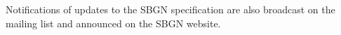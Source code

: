 Notifications of updates to the SBGN specification are also broadcast on 
the mailing list and announced on the SBGN website.








